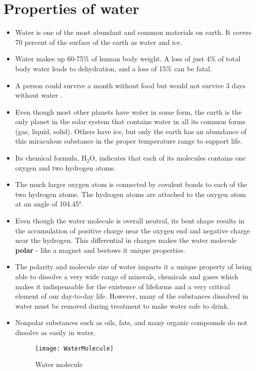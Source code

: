 \section{Properties of water}
\begin{itemize}
\item Water is one of the most abundant and common materials on earth. It covers 70 percent of the surface of the earth as water and ice.
\item Water makes up 60-75\% of human body weight. A loss of just 4\% of total body water leads to dehydration, and a loss of 15\% can be fatal.
\item A person could survive a month without food but would not survive 3 days without water .
\item Even though most other planets have water in some form, the earth is the only planet in the solar system that contains water in all its common forms (gas, liquid, solid).  Others have ice, but only the earth has an abundance of this miraculous substance in the proper temperature range to support life.
\item Its chemical formula, H$_2$O, indicates that each of its molecules contains one oxygen and two hydrogen atoms.  
\item The much larger oxygen atom is connected by covalent bonds to each of the two hydrogen atome. The hydrogen atoms are attached to the oxygen atom at an angle of 104.45\si{\degree}.
\item Even though the water molecule is overall neutral, its bent shape results in the accumulation of positive charge near the oxygen end and negative charge near the hydrogen.  This differential in charges makes the water molecule \textbf{polar}  - like a magnet and bestows it unique properties. 
\item The polarity and molecule size of water imparts it a unique property of being able to dissolve a very wide range of minerals, chemicals and gases which makes it indispensable for the existence of lifeforms and a very critical element of our day-to-day life.  However, many of the substances dissolved in water must be removed during treatment to make water safe to drink.
\item Nonpolar substances such as oils, fats, and many organic compounds do not dissolve as easily in water.
\begin{figure}[h]
\begin{center}
        \texttt{[image: WaterMolecule]}
        \caption{Water molecule}
        \label{Water molecule}
\end{center}
\end{figure}
\vspace{0.5cm}


\end{itemize}
